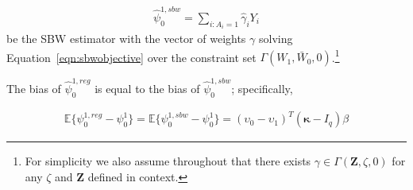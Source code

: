 \begin{align*}
\hat{\psi}^{1, sbw}_0 = \sum_{i: A_i = 1} \hat{\gamma}_i Y_i
\end{align*}
%
be the SBW estimator with the vector of weights $\gamma$ solving Equation~\ref{eqn:sbwobjective} over the constraint set $\Gamma(W_1, \bar{W}_0, 0)$.\footnote{For simplicity we also assume throughout that there exists $\gamma \in \Gamma(\mathbf{Z}, \zeta, 0)$ for any $\zeta$ and $\mathbf{Z}$ defined in context.}

\begin{proposition}\label{cl1}
The bias of $\hat{\psi}^{1, reg}_0$ is equal to the bias of $\hat{\psi}^{1, sbw}_0$; specifically, 

\begin{align*}
\mathbb{E}\{\psi^{1, reg}_0 - \psi^1_0\} = \mathbb{E}\{\psi^{1, sbw}_0 - \psi^1_0\} = (\upsilon_0 - \upsilon_1)^T(\mathbf{\kappa} - I_q)\beta
\end{align*}
\end{proposition}

